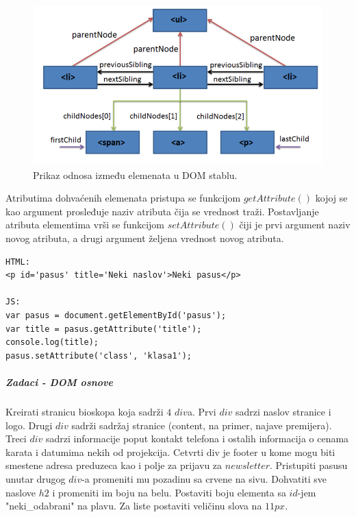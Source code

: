 \begin{figure}[h!]
\begin{center}
\includegraphics[scale=0.5]{../pictures/parentchild.png}
\end{center}
\caption{Prikaz odnosa između elemenata u DOM stablu.}
\label{fig:dom2}
\end{figure}	
Atributima dohvaćenih elemenata pristupa se funkcijom $getAttribute()$ kojoj se kao argument prosleđuje naziv atributa čija se vrednost traži. Postavljanje atributa elementima vrši se funkcijom $setAttribute()$ čiji je prvi argument naziv novog atributa, a drugi argument željena vrednost novog atributa.
\begin{lstlisting}[backgroundcolor = \color{lightgray}, breaklines=true]
HTML:
<p id='pasus' title='Neki naslov'>Neki pasus</p>

JS:
var pasus = document.getElementById('pasus');
var title = pasus.getAttribute('title');
console.log(title);
pasus.setAttribute('class', 'klasa1');
\end{lstlisting}

\subparagraph{Zadaci - DOM osnove }
\begin{primer}
Kreirati stranicu bioskopa koja sadrži $4$ $div$a. Prvi $div$ sadrzi naslov stranice i logo. Drugi $div$ sadrži sadržaj stranice (content, na primer, najave premijera). Treci $div$ sadrzi informacije poput kontakt telefona i ostalih informacija o cenama karata i datumima nekih od projekcija. Cetvrti div je footer u kome mogu biti smestene adresa preduzeca kao i polje za prijavu za $newsletter$. Pristupiti pasusu unutar drugog $div$-a promeniti mu pozadinu sa crvene na sivu. Dohvatiti sve naslove $h2$ i promeniti im boju na belu. Postaviti boju elementa sa $id$-jem "neki\_odabrani" na plavu. Za liste postaviti veličinu slova na $11px$. 
\end{primer}

